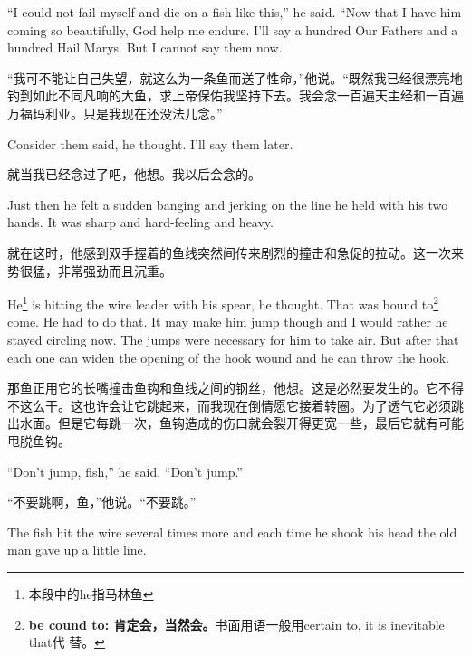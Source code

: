 \begin{paracol}{2}
\switchcolumn*

``I could not fail myself and die on a fish like this,'' he said. ``Now that
I have him coming so beautifully, God help me endure. I'll say a hundred Our
Fathers and a hundred Hail Marys. But I cannot say them now.

\switchcolumn

“我可不能让自己失望，就这么为一条鱼而送了性命，”他说。“既然我已经很漂亮地钓到如此不同凡响的大鱼，求上帝保佑我坚持下去。我会念一百遍天主经和一百遍万福玛利亚。只是我现在还没法儿念。”

\switchcolumn*

Consider them said, he thought. I'll say them later.

\switchcolumn

就当我已经念过了吧，他想。我以后会念的。

\switchcolumn*

Just then he felt a sudden banging and jerking on the line he held with his
two hands. It was sharp and \gls{hard-feeling} and heavy.

\switchcolumn

就在这时，他感到双手握着的鱼线突然间传来剧烈的撞击和急促的拉动。这一次来势很猛，非常强劲而且沉重。

\switchcolumn*

He\footnote{本段中的he指马林鱼} is hitting the wire leader with his
\gls{spear}, he thought. That was \gls{bound} to\footnote{\textbf{be cound
    to: 肯定会，当然会。}书面用语一般用certain to, it is inevitable that代
  替。} come. He had to do that. It may make him jump though and I would
rather he stayed circling now. The jumps were necessary for him to take air.
But after that each one can widen the opening of the hook \gls{wound} and he
can throw the hook.

\switchcolumn

那鱼正用它的长嘴撞击鱼钩和鱼线之间的钢丝，他想。这是必然要发生的。它不得不这么干。这也许会让它跳起来，而我现在倒情愿它接着转圈。为了透气它必须跳出水面。但是它每跳一次，鱼钩造成的伤口就会裂开得更宽一些，最后它就有可能甩脱鱼钩。

\switchcolumn*

``Don't jump, fish,'' he said. ``Don't jump.''

\switchcolumn

“不要跳啊，鱼，”他说。“不要跳。”

\switchcolumn*

The fish hit the wire several times more and each time he \gls{shook} his
head the old man gave up a little line.


\end{paracol}
